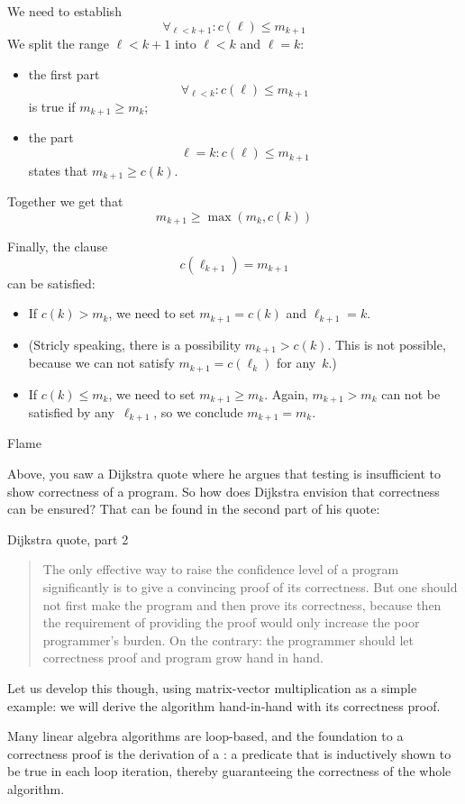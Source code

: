 We need to establish
\[ \forall_{\ell<k+1}\colon c(\ell)\leq m_{k+1} \]
We split the range $\ell<k+1$ into $\ell<k$ and $\ell=k$:
\begin{itemize}
\item the first part
  \[ \forall_{\ell<k}\colon c(\ell)\leq m_{k+1} \]
  is true if $m_{k+1}\geq m_k$;
\item the part
  \[ \ell=k \colon c(\ell)\leq m_{k+1} \]
  states that $m_{k+1}\geq c(k)$.
\end{itemize}
Together we get that
\[ m_{k+1}\geq \max(m_k,c(k)) \]

Finally, the clause \[ c(\ell_{k+1})=m_{k+1} \]
can be satisfied:
\begin{itemize}
\item If $c(k)>m_k$, we need to set $m_{k+1}=c(k)$ and $\ell_{k+1}=k$.
\item (Stricly speaking, there is a possibility 
  $m_{k+1}>c(k)$. This is not possible, because we
  can not satisfy $m_{k+1}=c(\ell_k)$ for any~$k$.)
\item If $c(k)\leq m_k$, we need to set $m_{k+1}\geq m_k$.
  Again, $m_{k+1}>m_k$ can not be satisfied by any~$\ell_{k+1}$,
  so we conclude $m_{k+1}=m_k$.
\end{itemize}

 {Flame}

Above, you saw a Dijkstra quote where he argues that testing is
insufficient to show correctness of a program.
So how does Dijkstra envision that correctness can be ensured?
That can be found in the second part of his quote:

\begin{block}{Dijkstra quote, part 2}
  \begin{quotation}
    The only effective way to raise the confidence level of a
    program significantly is to give a convincing proof of its
    correctness. But one should not first make the program and then
    prove its correctness, because then the requirement of providing
    the proof would only increase the poor programmer’s burden. On the
    contrary: the programmer should let correctness proof and program
    grow hand in hand.
  \end{quotation}
\end{block}

Let us develop this though, using matrix-vector multiplication
as a simple example:
we will derive the algorithm hand-in-hand with its correctness proof.

Many linear algebra algorithms are loop-based, and the foundation
to a correctness proof is the derivation of a :
a predicate that is inductively shown to be true in each loop iteration,
thereby guaranteeing the correctness of the whole algorithm.

